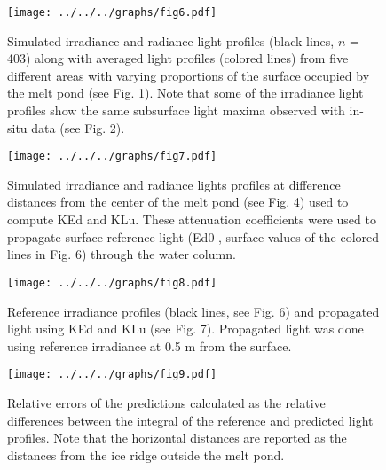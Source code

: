 \documentclass[12pt,a4paper]{scrartcl}
\begin{document}
\clearpage
\newpage

\begin{figure}[ht]
	\centering
	\texttt{[image: ../../../graphs/fig6.pdf]}
	\caption{Simulated irradiance and radiance light profiles (black lines, $n$ = 403) along with averaged light profiles (colored lines) from five different areas with varying proportions of the surface occupied by the melt pond (see Fig. 1). Note that some of the irradiance light profiles show the same subsurface light maxima observed with in-situ data (see Fig. 2).}
\end{figure}

\clearpage
\newpage

\begin{figure}[ht]
	\centering
	\texttt{[image: ../../../graphs/fig7.pdf]}
	\caption{Simulated irradiance and radiance lights profiles at difference distances from the center of the melt pond (see Fig. 4) used to compute KEd and KLu. These attenuation coefficients were used to propagate surface reference light (Ed0-, surface values of the colored lines in Fig. 6) through the water column.}
\end{figure}

\clearpage
\newpage

\begin{figure}[ht]
	\centering
	\texttt{[image: ../../../graphs/fig8.pdf]}
	\caption{Reference irradiance profiles (black lines, see Fig. 6) and propagated light using KEd and KLu (see Fig. 7). Propagated light was done using reference irradiance at 0.5 m from the surface.}
\end{figure}

\clearpage
\newpage

\begin{figure}[ht]
	\centering
	\texttt{[image: ../../../graphs/fig9.pdf]}
	\caption{Relative errors of the predictions calculated as the relative differences between the integral of the reference and predicted light profiles. Note that the horizontal distances are reported as the distances from the ice ridge outside the melt pond.}
\end{figure}
\end{document}
